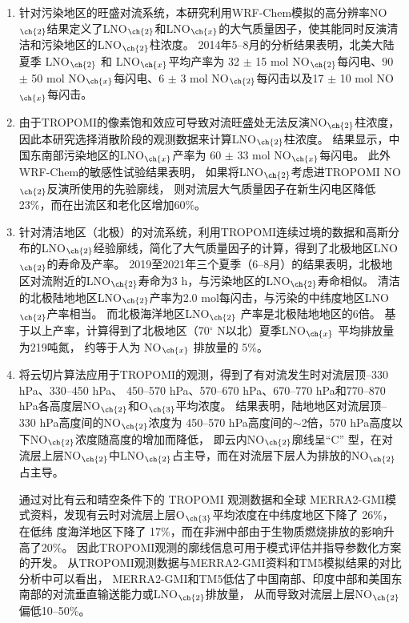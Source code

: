\begin{enumerate}[label=（\arabic*）, labelindent=\parindent, nosep, leftmargin=0pt, widest=0, itemindent=*, topsep=0pt, partopsep=0pt, parsep=0pt]

\item 针对污染地区的旺盛对流系统，本研究利用WRF-Chem模拟的高分辨率NO$_{\ch{2}}$结果定义了LNO$_{\ch{2}}$和LNO$_{\ch{x}}$的大气质量因子，使其能同时反演清洁和污染地区的LNO$_{\ch{2}}$柱浓度。
2014年5--8月的分析结果表明，北美大陆夏季 LNO$_{\ch{2}}$ 和 LNO$_{\ch{x}}$平均产率为
32 $\pm$ 15 mol NO$_{\ch{2}}$每闪电、90 $\pm$ 50 mol NO$_{\ch{x}}$每闪电、6 $\pm$ 3 mol NO$_{\ch{2}}$每闪击以及17 $\pm$ 10 mol NO$_{\ch{x}}$每闪击。

\item 由于TROPOMI的像素饱和效应可导致对流旺盛处无法反演NO$_{\ch{2}}$柱浓度，因此本研究选择消散阶段的观测数据来计算LNO$_{\ch{2}}$柱浓度。
结果显示，中国东南部污染地区的LNO$_{\ch{x}}$产率为 60 $\pm$ 33 mol NO$_{\ch{x}}$每闪电。
此外WRF-Chem的敏感性试验结果表明，
如果将LNO$_{\ch{2}}$考虑进TROPOMI NO$_{\ch{2}}$反演所使用的先验廓线，
则对流层大气质量因子在新生闪电区降低23\%，而在出流区和老化区增加60\%。

\item 针对清洁地区（北极）的对流系统，利用TROPOMI连续过境的数据和高斯分布的LNO$_{\ch{2}}$经验廓线，简化了大气质量因子的计算，得到了北极地区LNO$_{\ch{2}}$的寿命及产率。
2019至2021年三个夏季（6--8月）的结果表明，北极地区对流附近的LNO$_{\ch{2}}$寿命为3 h，与污染地区的LNO$_{\ch{2}}$寿命相似。
清洁的北极陆地地区LNO$_{\ch{2}}$产率为2.0 mol每闪击，与污染的中纬度地区LNO$_{\ch{2}}$产率相当。
而北极海洋地区LNO$_{\ch{2}}$ 产率是北极陆地地区的6倍。
基于以上产率，计算得到了北极地区（70$^{\circ}$ N以北）夏季LNO$_{\ch{x}}$ 平均排放量为219吨氮，
约等于人为 NO$_{\ch{x}}$ 排放量的 5\%。

\item 将云切片算法应用于TROPOMI的观测，得到了有对流发生时对流层顶--330 hPa、330--450 hPa、
450--570 hPa、570--670 hPa、670--770 hPa和770--870 hPa各高度层NO$_{\ch{2}}$和O$_{\ch{3}}$平均浓度。
结果表明，陆地地区对流层顶--330 hPa高度间的NO$_{\ch{2}}$浓度为 450--570 hPa高度间的$\sim$2倍，570 hPa高度以下NO$_{\ch{2}}$浓度随高度的增加而降低，
即云内NO$_{\ch{2}}$廓线呈“C” 型，在对流层上层NO$_{\ch{2}}$中LNO$_{\ch{2}}$占主导，而在对流层下层人为排放的NO$_{\ch{2}}$占主导。

通过对比有云和晴空条件下的 TROPOMI 观测数据和全球
MERRA2-GMI模式资料，发现有云时对流层上层O$_{\ch{3}}$平均浓度在中纬度地区下降了 26\%，在低纬
度海洋地区下降了 17\%，而在非洲中部由于生物质燃烧排放的影响升高了20\%。
因此TROPOMI观测的廓线信息可用于模式评估并指导参数化方案的开发。
从TROPOMI观测数据与MERRA2-GMI资料和TM5模拟结果的对比分析中可以看出，
MERRA2-GMI和TM5低估了中国南部、印度中部和美国东南部的对流垂直输送能力或LNO$_{\ch{2}}$排放量，
从而导致对流层上层NO$_{\ch{2}}$偏低10--50\%。


\end{enumerate}

